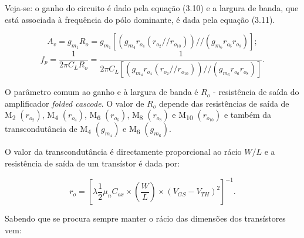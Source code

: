 \documentclass[11pt]{article}
\numberwithin{equation}{section}
\begin{document}
Veja-se: o ganho do circuito é dado pela equação (3.10) e a largura de banda, que está associada à frequência do pólo dominante, é dada pela equação (3.11).

\vspace{-3mm}
\begin{equation}
A_{v} = g_{m_1} R_o =  g_{m_1}\left[\left(g_{m_4}r_{o_4}\left(r_{o_2}//r_{o_{10}}\right)\right)//\left(g_{m_6}r_{o_6}r_{o_8}\right)\right];
\end{equation}
\vspace{-2mm}
\begin{equation}
f_{p} = \frac{1}{2\pi C_L R_o} = \frac{1}{2\pi C_L \left[\left(g_{m_4}r_{o_4}\left(r_{o_2}//r_{o_{10}}\right)\right)//\left(g_{m_6}r_{o_6}r_{o_8}\right)\right]}.
\end{equation}

\vspace{4mm}

O parâmetro comum ao ganho e à largura de banda é $R_o$ - resistência de saída do amplificador \textit{folded cascode}. O valor de $R_o$ depende das resistências de saída de M\textsubscript{2} $\left(r_{o_2}\right)$, M\textsubscript{4} $\left(r_{o_4}\right)$, M\textsubscript{6} $\left(r_{o_6}\right)$, M\textsubscript{8} $\left(r_{o_8}\right)$ e M\textsubscript{10} $\left(r_{o_{10}}\right)$ e também da transcondutância de M\textsubscript{4} $\left(g_{m_4}\right)$ e M\textsubscript{6} $\left(g_{m_6}\right)$. 

O valor da transcondutância é directamente proporcional ao rácio $W/L$ e a resistência de saída de um transístor é dada por:

\vspace{-3mm}
\begin{equation}
r_{o} = \left[\lambda \frac{1}{2}\mu_{n}C_{ox}\times \left(\frac{W}{L}\right) \times \left(V_{GS}-V_{TH}\right)^2\right]^{-1}.
\end{equation}

\vspace{1mm}
Sabendo que se procura sempre manter o rácio das dimensões dos transístores vem:
\end{document}
